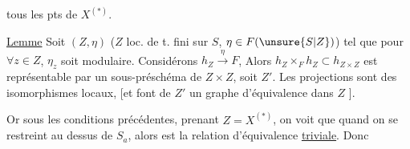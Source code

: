 tous les pts de $X^{(*)}$.


\uline{Lemme} Soit $(Z,\eta)$ ($Z$ loc. de t. fini sur $S$, $\eta\in F(\unsure{S|Z})$) tel que pour $\forall z\in Z$, $\eta_z$ soit modulaire. Considérons $h_Z\xrightarrow{\eta}F$, 
Alors $h_Z\times_F h_Z\subset h_{Z\times Z}$ est représentable par un sous-préschéma de $Z\times Z$, soit $Z'$. Les projections
sont des isomorphismes locaux, [et font de $Z'$ un  graphe d'équivalence dans $Z$ \unsure{$\ldots$}].

Or sous les conditions précédentes, prenant $Z=X^{(*)}$, on voit que quand on se restreint au dessus de $S_a$, alors
est la relation d'équivalence \uline{triviale}. Donc
